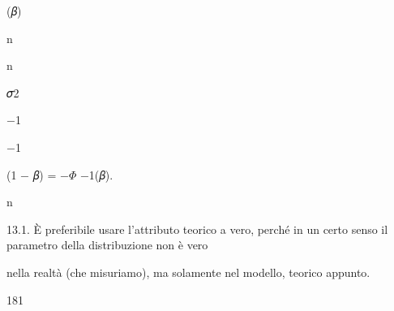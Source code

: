 \documentclass[a4paper,portrait,12pt]{article}
\begin{document}
\begin{flushleft}
(𝛽)
\end{flushleft}





\begin{flushleft}
n
\end{flushleft}





\begin{flushleft}
n
\end{flushleft}





\begin{flushleft}
𝜎2
\end{flushleft}





$-$1





$-$1





\begin{flushleft}
(1 $-$ 𝛽) = $-$$\Phi$ $-$1(𝛽).
\end{flushleft}





\begin{flushleft}
n
\end{flushleft}





\begin{flushleft}
13.1. \`{E} preferibile usare l'attributo teorico a vero, perch\'{e} in un certo senso il parametro della distribuzione non \`{e} vero
\end{flushleft}


\begin{flushleft}
nella realt\`{a} (che misuriamo), ma solamente nel modello, teorico appunto.
\end{flushleft}





181





\end{document}
